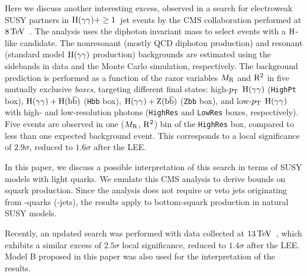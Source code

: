 Here we discuss another interesting excess, observed in a search
for electroweak SUSY partners in $\mathrm{H} ({\gamma}{\gamma})+ \geq 1$~jet events by the CMS
collaboration performed at $8\,\text{Te\hspace{-.08em}V}$~\cite{RazorHgaga}. The analysis uses the diphoton
invariant mass \mgaga to select events with a $\mathrm{H}$-like
candidate. The nonresonant (mostly QCD
diphoton production) and resonant (standard model $\mathrm{H}({\gamma}{\gamma})$
production) backgrounds are estimated using the \mgaga sidebands in data
and the Monte Carlo simulation, respectively. The background prediction is performed as a
function of the razor variables $M_\mathrm{R}$ and $\mathrm{R}^2$ in five mutually
exclusive \emph{boxes}, targeting different final states:
high-$p_{\mathrm{T}}$ $\mathrm{H} ({\gamma}{\gamma})$ (\texttt{HighPt} box), $\mathrm{H}
({\gamma}{\gamma})+\mathrm{H} (\mathrm{b}\overline{\mathrm{b}})$ (\texttt{Hbb} box), $\mathrm{H}
({\gamma}{\gamma})+\mathrm{Z} (\mathrm{b}\overline{\mathrm{b}})$ (\texttt{Zbb} box), and low-$p_{\mathrm{T}}$ $\mathrm{H}
({\gamma}{\gamma})$ with high- and low-resolution photons
(\texttt{HighRes} and \texttt{LowRes} boxes, respectively). Five events are
observed in one ($M_\mathrm{R}$, $\mathrm{R}^2$) bin of the \texttt{HighRes} box, compared
to less than one expected background event. This corresponds to a
local significance of $2.9\sigma$, reduced to $1.6\sigma$ after the
LEE. 

In this paper, we discuss a possible interpretation of this search in
terms of SUSY models with light quarks. We emulate this CMS analysis
to derive bounds on squark production. Since the analysis does not
require or veto jets originating from \cPqb-quarks (\cPqb-jets), the results
apply to bottom-squark production in natural SUSY models. 

Recently, an updated search was performed with data collected at
$13\,\text{Te\hspace{-.08em}V}$~\cite{CMS-PAS-SUS-16-012}, which exhibits a similar excess of
$2.5\sigma$ local significance, reduced to $1.4\sigma$ after the
LEE. Model B proposed in this paper was also used for the interpretation of the results. 

